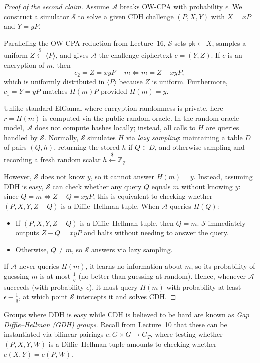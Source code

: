\begin{proof}[Proof of the second claim]
    Assume \(\mathcal{A}\) breaks OW-CPA with probability \(\epsilon\).
    We construct a simulator \(\mathcal{S}\) to solve a given CDH challenge \((P, X, Y)\) with \(X = xP\) and \(Y = yP\).

    Paralleling the OW-CPA reduction from Lecture~16, \(\mathcal{S}\) sets \(\mathsf{pk} \gets X\), samples a uniform \(Z \xleftarrow{\$} \langle P \rangle\), and gives \(\mathcal{A}\) the challenge ciphertext \(c = (Y, Z)\).
    If \(c\) is an encryption of \(m\), then
    \[
        c_2 = Z = xyP + m \iff m = Z - xyP,
    \]
    which is uniformly distributed in \(\langle P \rangle\) because \(Z\) is uniform.
    Furthermore, \(c_1 = Y = yP\) matches \(H(m)P\) provided \(H(m) = y\).

    Unlike standard ElGamal where encryption randomness is private, here \(r = H(m)\) is computed via the public random oracle.
    In the random oracle model, \(\mathcal{A}\) does not compute hashes locally; instead, all calls to \(H\) are queries handled by \(\mathcal{S}\).
    Normally, \(\mathcal{S}\) simulates \(H\) via \emph{lazy sampling}: maintaining a table \(D\) of pairs \((Q, h)\), returning the stored \(h\) if \(Q \in D\), and otherwise sampling and recording a fresh random scalar \(h \xleftarrow{\$} \mathbb{Z}_q\).

    However, \(\mathcal{S}\) does not know \(y\), so it cannot answer \(H(m) = y\).
    Instead, assuming DDH is easy, \(\mathcal{S}\) can check whether any query \(Q\) equals \(m\) without knowing \(y\): since \(Q = m \iff Z - Q = xyP\), this is equivalent to checking whether \((P, X, Y, Z - Q)\) is a Diffie--Hellman tuple.
    When \(\mathcal{A}\) queries \(H(Q)\):
    \begin{itemize}
        \item If \((P, X, Y, Z - Q)\) is a Diffie--Hellman tuple, then \(Q = m\). \(\mathcal{S}\) immediately outputs \(Z - Q = xyP\) and halts without needing to answer the query.
        \item Otherwise, \(Q \neq m\), so \(\mathcal{S}\) answers via lazy sampling.
    \end{itemize}

    If \(\mathcal{A}\) never queries \(H(m)\), it learns no information about \(m\), so its probability of guessing \(m\) is at most \(\frac{1}{q}\) (no better than guessing at random).
    Hence, whenever \(\mathcal{A}\) succeeds (with probability \(\epsilon\)), it must query \(H(m)\) with probability at least \(\epsilon - \frac{1}{q}\), at which point \(\mathcal{S}\) intercepts it and solves CDH.
\end{proof}

\begin{remark}
    Groups where DDH is easy while CDH is believed to be hard are known as \emph{Gap Diffie--Hellman (GDH) groups}.
    Recall from Lecture~10 that these can be instantiated via bilinear pairings \(e: G \times G \to G_T\), where testing whether \((P, X, Y, W)\) is a Diffie--Hellman tuple amounts to checking whether \(e(X, Y) = e(P, W)\).
\end{remark}